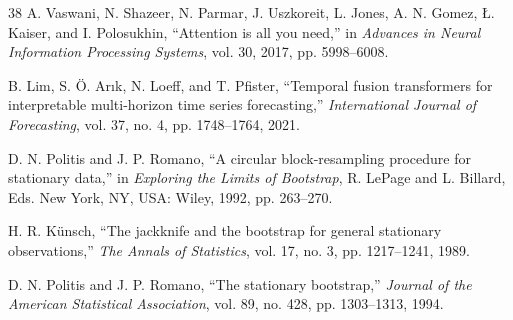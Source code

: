 \documentclass[conference]{IEEEtran}
\begin{document}
\begin{thebibliography}{38}
 A. Vaswani, N. Shazeer, N. Parmar, J. Uszkoreit, L. Jones,
A. N. Gomez, {\L}. Kaiser, and I. Polosukhin, ``Attention is all you need,'' in
\emph{Advances in Neural Information Processing Systems}, vol. 30, 2017,
pp. 5998--6008.

 B. Lim, S. \"O. Ar{\i}k, N. Loeff, and T. Pfister, ``Temporal
fusion transformers for interpretable multi-horizon time series forecasting,''
\emph{International Journal of Forecasting}, vol. 37, no. 4, pp. 1748--1764,
2021.

 D. N. Politis and J. P. Romano, ``A circular
block-resampling procedure for stationary data,'' in \emph{Exploring the Limits
of Bootstrap}, R. LePage and L. Billard, Eds. New York, NY, USA: Wiley, 1992,
pp. 263--270.

 H. R. K\"unsch, ``The jackknife and the bootstrap for
general stationary observations,'' \emph{The Annals of Statistics}, vol. 17,
no. 3, pp. 1217--1241, 1989.

 D. N. Politis and J. P. Romano, ``The stationary
bootstrap,'' \emph{Journal of the American Statistical Association}, vol. 89,
no. 428, pp. 1303--1313, 1994.
\end{thebibliography}
\end{document}

